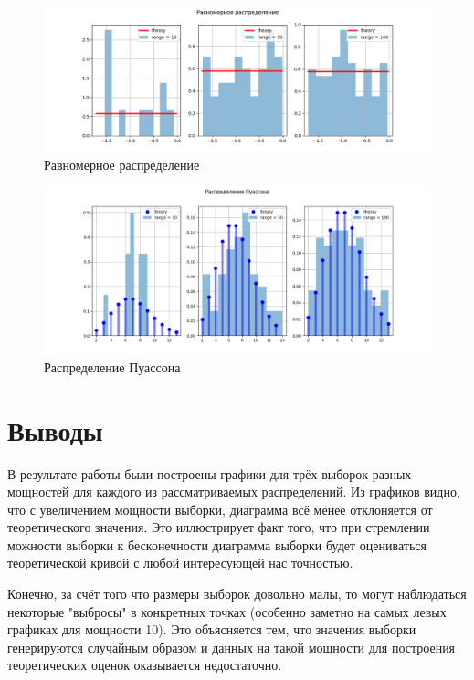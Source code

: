 \documentclass[12pt]{report}
\begin{document}
\begin{figure}[h!]
\begin{center}
\includegraphics[width=\textwidth]{../lab_1/pic/uniform.png}
\caption{Равномерное распределение}
\end{center}
\end{figure}

\pagebreak

\begin{figure}[h!]
\begin{center}
\includegraphics[width=\textwidth]{../lab_1/pic/poisson.png}
\caption{Распределение Пуассона}
\end{center}
\end{figure}

\section{Выводы}

В результате работы были построены графики для трёх выборок разных мощностей для каждого из рассматриваемых распределений. Из графиков видно, что с увеличением мощности выборки, диаграмма всё менее отклоняется от теоретического значения. Это иллюстрирует факт того, что при стремлении можности выборки к бесконечности диаграмма выборки будет оцениваться теоретической кривой с любой интересующей нас точностью.
\par
Конечно, за счёт того что размеры выборок довольно малы, то могут наблюдаться некоторые "выбросы" в конкретных точках (особенно заметно на самых левых графиках для мощности 10). Это объясняется тем, что значения выборки генерируются случайным образом и данных на такой мощности для построения теоретических оценок оказывается недостаточно.
\end{document}
